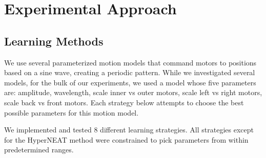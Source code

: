 \section{Experimental Approach}



\subsection{Learning Methods}




We use several parameterized motion models that command motors to
positions based on a sine wave, creating a periodic pattern.  While we
investigated several models, for the bulk of our experiments, we used
a model whose five parameters are: amplitude, wavelength, scale inner
vs outer motors, scale left vs right motors, scale back vs front
motors. Each strategy below attempts to choose the best possible
parameters for this motion model.  

We implemented and tested 8 different learning strategies.  All
strategies except for the HyperNEAT method\cite{clune} were
constrained to pick parameters from within predetermined ranges.

